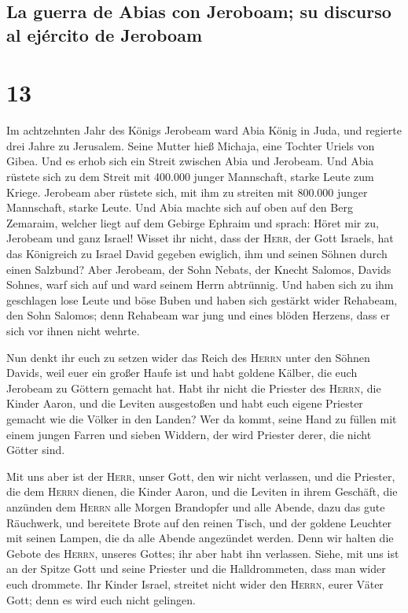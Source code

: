 \hypertarget{la-guerra-de-abias-con-jeroboam-su-discurso-al-ejuxe9rcito-de-jeroboam}{%
\subsection{La guerra de Abias con Jeroboam; su discurso al ejército de
Jeroboam}\label{la-guerra-de-abias-con-jeroboam-su-discurso-al-ejuxe9rcito-de-jeroboam}}

\hypertarget{section-12}{%
\section{13}\label{section-12}}

 Im achtzehnten Jahr des Königs Jerobeam ward Abia König
in Juda,  und regierte drei Jahre zu Jerusalem. Seine
Mutter hieß Michaja, eine Tochter Uriels von Gibea. Und es erhob sich
ein Streit zwischen Abia und Jerobeam.  Und Abia rüstete
sich zu dem Streit mit 400.000 junger Mannschaft, starke Leute zum
Kriege. Jerobeam aber rüstete sich, mit ihm zu streiten mit 800.000
junger Mannschaft, starke Leute.  Und Abia machte sich auf
oben auf den Berg Zemaraim, welcher liegt auf dem Gebirge Ephraim und
sprach: Höret mir zu, Jerobeam und ganz Israel!  Wisset
ihr nicht, dass der \textsc{Herr}, der Gott Israels, hat das Königreich
zu Israel David gegeben ewiglich, ihm und seinen Söhnen durch einen
Salzbund?  Aber Jerobeam, der Sohn Nebats, der Knecht
Salomos, Davids Sohnes, warf sich auf und ward seinem Herrn abtrünnig.
 Und haben sich zu ihm geschlagen lose Leute und böse
Buben und haben sich gestärkt wider Rehabeam, den Sohn Salomos; denn
Rehabeam war jung und eines blöden Herzens, dass er sich vor ihnen nicht
wehrte.

 Nun denkt ihr euch zu setzen wider das Reich des
\textsc{Herrn} unter den Söhnen Davids, weil euer ein großer Haufe ist
und habt goldene Kälber, die euch Jerobeam zu Göttern gemacht hat.
 Habt ihr nicht die Priester des \textsc{Herrn}, die
Kinder Aaron, und die Leviten ausgestoßen und habt euch eigene Priester
gemacht wie die Völker in den Landen? Wer da kommt, seine Hand zu füllen
mit einem jungen Farren und sieben Widdern, der wird Priester derer, die
nicht Götter sind.

 Mit uns aber ist der \textsc{Herr}, unser Gott, den wir
nicht verlassen, und die Priester, die dem \textsc{Herrn} dienen, die
Kinder Aaron, und die Leviten in ihrem Geschäft,  die
anzünden dem \textsc{Herrn} alle Morgen Brandopfer und alle Abende, dazu
das gute Räuchwerk, und bereitete Brote auf den reinen Tisch, und der
goldene Leuchter mit seinen Lampen, die da alle Abende angezündet
werden. Denn wir halten die Gebote des \textsc{Herrn}, unseres Gottes;
ihr aber habt ihn verlassen.  Siehe, mit uns ist an der
Spitze Gott und seine Priester und die Halldrommeten, dass man wider
euch drommete. Ihr Kinder Israel, streitet nicht wider den
\textsc{Herrn}, eurer Väter Gott; denn es wird euch nicht gelingen.


